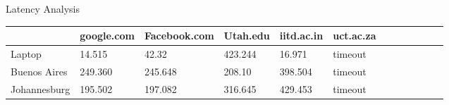 \documentclass{article}
\begin{document}
\begin{enumerate}[a.]
Latency Analysis

\begin{table}[!ht]
    \centering
    \begin{tabular}{|l|l|l|l|l|l|l|l|l|l|}
    \hline
        ~ & google.com & Facebook.com & Utah.edu & iitd.ac.in & uct.ac.za & ~ & ~ & ~ & ~ \\ \hline
        Laptop & 14.515 & 42.32 & 423.244 & 16.971 & timeout & ~ & ~ & ~ & ~ \\ \hline
        Buenos Aires & 249.360 & 245.648 & 208.10 & 398.504 & timeout & ~ & ~ & ~ & ~ \\ \hline
        Johannesburg & 195.502 & 197.082 & 316.645 & 429.453 & timeout & ~ & ~ & ~ & ~ \\ \hline
    \end{tabular}
\end{table}
\end{enumerate}

\clearpage
\end{document}
